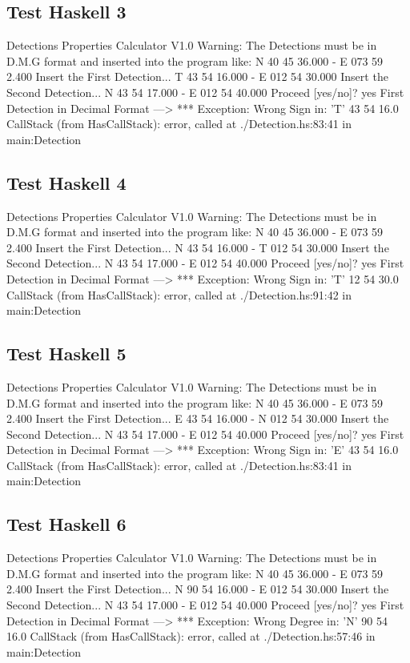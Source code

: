 \documentclass{article}
\begin{document}
\subsection*{Test Haskell 3}
	\begin{spverbatim}
		Detections Properties Calculator V1.0 
		Warning: The Detections must be in D.M.G format and inserted into the program like: N 40 45 36.000 - E 073 59 2.400
		Insert the First Detection...
		T 43 54 16.000 - E 012 54 30.000
		Insert the Second Detection...
		N 43 54 17.000 - E 012 54 40.000
		Proceed [yes/no]?
		yes
		First Detection in Decimal Format ---> *** Exception: Wrong Sign in:  'T' 43 54 16.0
		CallStack (from HasCallStack):
		error, called at ./Detection.hs:83:41 in main:Detection
	\end{spverbatim}

\subsection*{Test Haskell 4}
	\begin{spverbatim}
		Detections Properties Calculator V1.0 
		Warning: The Detections must be in D.M.G format and inserted into the program like: N 40 45 36.000 - E 073 59 2.400
		Insert the First Detection...
		N 43 54 16.000 - T 012 54 30.000
		Insert the Second Detection...
		N 43 54 17.000 - E 012 54 40.000
		Proceed [yes/no]?
		yes
		First Detection in Decimal Format ---> *** Exception: Wrong Sign in:  'T' 12 54 30.0
		CallStack (from HasCallStack):
		error, called at ./Detection.hs:91:42 in main:Detection
	\end{spverbatim}

\subsection*{Test Haskell 5}
	\begin{spverbatim}
		Detections Properties Calculator V1.0 
		Warning: The Detections must be in D.M.G format and inserted into the program like: N 40 45 36.000 - E 073 59 2.400
		Insert the First Detection...
		E 43 54 16.000 - N 012 54 30.000
		Insert the Second Detection...
		N 43 54 17.000 - E 012 54 40.000
		Proceed [yes/no]?
		yes
		First Detection in Decimal Format ---> *** Exception: Wrong Sign in:  'E' 43 54 16.0
		CallStack (from HasCallStack):
		error, called at ./Detection.hs:83:41 in main:Detection
	\end{spverbatim}

\subsection*{Test Haskell 6}
	\begin{spverbatim}
		Detections Properties Calculator V1.0 
		Warning: The Detections must be in D.M.G format and inserted into the program like: N 40 45 36.000 - E 073 59 2.400
		Insert the First Detection...
		N 90 54 16.000 - E 012 54 30.000
		Insert the Second Detection...
		N 43 54 17.000 - E 012 54 40.000
		Proceed [yes/no]?
		yes
		First Detection in Decimal Format ---> *** Exception: Wrong Degree in:  'N' 90 54 16.0
		CallStack (from HasCallStack):
		error, called at ./Detection.hs:57:46 in main:Detection
	\end{spverbatim}
\end{document}

